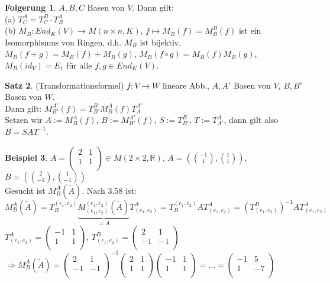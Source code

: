 \documentclass[10pt,a4paper,numbers=endperiod]{scrartcl}
\theoremstyle{definition}
\newtheorem{satz}{Satz}[section]
\newtheorem{bsp}[satz]{Beispiel}
\newtheorem{folg}[satz]{Folgerung}
\def\RR{{\mathbb R}}
\begin{document}
\begin{folg}
	$A,B,C$ Basen von $V$. Dann gilt:\\
	(a) $T_C^A = T_C^B \cdot T_B^A$\\
	(b) $M_B: End_K(V) \rightarrow M(n \times n , K)$, $f\mapsto M_B(f) = M_B^B(f)$ ist ein Isomorphismus von Ringen, d.h. $M_B$ ist bijektiv, $M_B(f+g) = M_B(f)+M_B(g)$, $M_B(f \circ g) = M_B(f)M_B(g)$, $M_B(id_V)=E_1$ für alle $f,g \in End_K (V)$.
\end{folg}

\begin{satz}
	(Transformationsformel) $f:V\rightarrow W$ lineare Abb., $A,A'$ Basen von $V$, $B,B'$ Basen von $W$.\\
	Dann gilt: $M_{B'}^{A'}(f) = T_{B'}^B M_B^A(f) T_A^{A'}$\\
	Setzen wir $A := M_B^A(f)$, $B := M_{B'}^{A'}(f)$, $S := T_{B'}^B$, $T:= T_{A'}^A$, dann gilt also $B = SAT^{-1}$.
\end{satz}

\begin{bsp}
		$A= \begin{pmatrix}
	2&1\\
	1&1\\
	\end{pmatrix} \in M(2 \times 2,\RR)$, 	 $A = (\binom{-1}{1}, \binom{1}{1})$, $B = (\binom{2}{-1}, \binom{1}{-1})$\\
	Gesucht ist $M_B^A(\tilde{A})$. Nach 3.58 ist:\\
	
	$M_B^A(\tilde{A})= T_B^{(e_1,e_2)} \underbrace{M_{(e_1,e_2)}^{(e_1,e_2)} (\tilde{A})}_{=A} T_{(e_1,e_2)}^A = T_B^{(e_1,e_2)} A T_{(e_1,e_2)}^A = (T_{(e_1,e_2)}^B)^{-1} A T_{(e_1,e_2)}^A$\\
	
	$T_{(e_1,e_2)}^A	 = \begin{pmatrix}
	-1&1\\
	1&1\\
	\end{pmatrix}$, $T_{(e_1,e_2)}^B = \begin{pmatrix}
	2&1\\
	-1&-1\\
	\end{pmatrix}$\\
	
	$\Rightarrow M_B^A(\tilde{A}) = \begin{pmatrix}
	2&1\\
	-1&-1\\
	\end{pmatrix}^{-1} \begin{pmatrix}
	2&1\\1&1\\
	\end{pmatrix} \begin{pmatrix}
	-1&1\\
	1&1\\
	\end{pmatrix}=\ldots=\begin{pmatrix}
	-1&5\\
	1&-7\\
	\end{pmatrix}$\\
\end{bsp}
\end{document}
